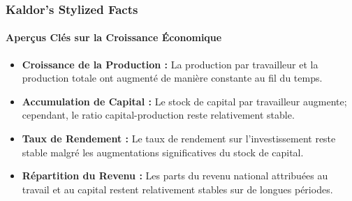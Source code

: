 \documentclass{beamer}
\begin{document}
\begin{frame}
    \frametitle{Kaldor's Stylized Facts}
    \framesubtitle{Aperçus Clés sur la Croissance Économique}
        \begin{itemize}
            \item \textbf{Croissance de la Production :} La production par travailleur et la production totale ont augmenté de manière constante au fil du temps.
            \item \textbf{Accumulation de Capital :} Le stock de capital par travailleur augmente; cependant, le ratio capital-production reste relativement stable.
            \item \textbf{Taux de Rendement :} Le taux de rendement sur l'investissement reste stable malgré les augmentations significatives du stock de capital.
            \item \textbf{Répartition du Revenu :} Les parts du revenu national attribuées au travail et au capital restent relativement stables sur de longues périodes.
        \end{itemize}
\end{frame}
    
\end{document}

